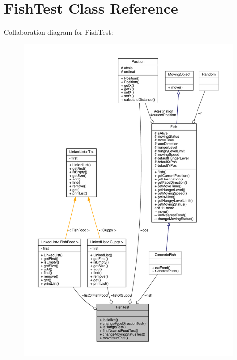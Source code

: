 \hypertarget{class_fish_test}{}\section{Fish\+Test Class Reference}
\label{class_fish_test}


Collaboration diagram for Fish\+Test\+:
\nopagebreak
\begin{figure}[H]
\begin{center}
\leavevmode
\includegraphics[width=350pt]{class_fish_test__coll__graph}
\end{center}
\end{figure}
